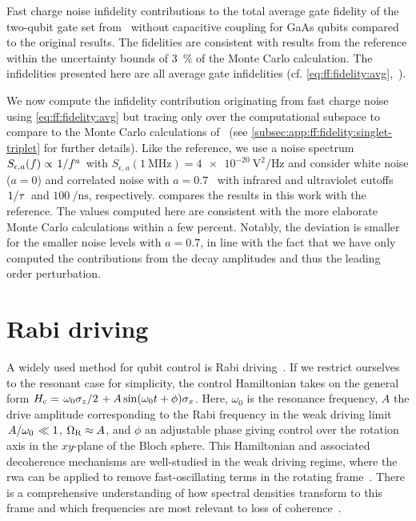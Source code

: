 \begin{table}
    \centering
    \caption{
        Fast charge noise infidelity contributions to the total average gate fidelity of the two-qubit gate set from~ without capacitive coupling for GaAs \sts qubits compared to the original results.
        The fidelities are consistent with results from the reference within the uncertainty bounds of \qty{3}{\percent} of the Monte Carlo calculation.
        The infidelities presented here are all average gate infidelities (cf.
        \cref{eq:ff:fidelity:avg},~).
    }
    \label{tab:ff:infidelities}
    
\end{table}

We now compute the infidelity contribution originating from fast charge noise using \cref{eq:ff:fidelity:avg} but tracing only over the computational subspace to compare to the Monte Carlo calculations of~ (see \cref{subsec:app:ff:fidelity:singlet-triplet} for further details).
Like the reference, we use a noise spectrum $S_{\epsilon,a}(f)\propto \flatfrac{1}{f^a}$ with $S_{\epsilon,a}(\qty{1}{\MHz}) = \qty{4e-20}{\volt\squared\per\Hz}$ and consider white noise ($a = 0$) and correlated noise with $a = 0.7$~\cite{Dial2013} with infrared and ultraviolet cutoffs $\flatfrac{1}{\tau}$ and $\qty{100}{\per\nano\second}$, respectively.
 compares the results in this work with the reference.
The values computed here are consistent with the more elaborate Monte Carlo calculations within a few percent.
Notably, the deviation is smaller for the smaller noise levels with $a = \num{0.7}$, in line with the fact that we have only computed the contributions from the decay amplitudes \decayamps and thus the leading order perturbation.

\section{Rabi driving}\label{sec:ff:examples:rabi_driving}
A widely used method for qubit control is Rabi driving~\cite{Wallraff2004,Barends2014,Soare2014,Veldhorst2014}.
If we restrict ourselves to the resonant case for simplicity, the control Hamiltonian takes on the general form $\Hc = \flatfrac{\omega_0\sz}{2} + A\sin(\omega_0 t + \phi)\sx$.
Here, $\omega_0$ is the resonance frequency, $A$ the drive amplitude corresponding to the Rabi frequency in the weak driving limit $\flatfrac{A}{\omega_\mr{0}}\ll 1$, $\Omega_{\mathrm{R}}\approx A$, and $\phi$ an adjustable phase giving control over the rotation axis in the $xy$-plane of the Bloch sphere.
This Hamiltonian and associated decoherence mechanisms are well-studied in the weak driving regime, where the \gls{rwa} can be applied to remove fast-oscillating terms in the rotating frame~\cite{Jaynes1963,Gerry2008}.
There is a comprehensive understanding of how spectral densities transform to this frame and which frequencies are most relevant to loss of coherence~\cite{Yan2013}.

